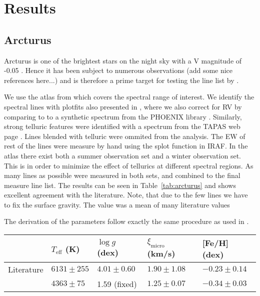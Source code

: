 \documentclass{aa}
\begin{document}
\section{Results}
\label{sec:results}



\subsection{Arcturus}
\label{sec:derived_parameters_of_the_sun}
Arcturus is one of the brightest stars on the night sky with a V magnitude of
-0.05 \citep{Ducati2002}. Hence it has been subject to numerous observations
(add some nice references here...) and is therefore a prime target for testing
the line list by \cite{Andreasen2016}.

We use the atlas from \cite{Hinkle2003} which covers the spectral range of
interest. We identify the spectral lines with plot\textunderscore{}fits also presented in
\cite{Andreasen2016}, where we also correct for RV by comparing to to a
synthetic spectrum from the PHOENIX library \citep{Husser2013}. Similarly,
strong telluric features were identified with a spectrum from the TAPAS
web page \citep{Bertaux2014}. Lines blended with telluric were ommited
from the analysis. The EW of rest of the lines were measure by hand using the
splot function in IRAF. In the atlas there exist both a summer observation
set and a winter observation set. This is in order to minimize the effect of
tellurics at different spectral regions. As many lines as possible were
measured in both sets, and combined to the final measure line list.
The results can be seen in Table~\ref{tab:arcturus} and shows excellent
agreement with the literature. Note, that due to the few  lines
we have to fix the surface gravity. The value was a mean of many literature
values

The derivation of the parameters follow exactly the same procedure as used
in \cite{Andreasen2016}.

\begin{table*}[htb!]
    \caption{The derived parameters for Arcturus with
    fixed surface gravity cut after 3$\sigma$ outlier removal. linelist: arcturus2Cut4ol.moog}
    \label{tab:arcturus}
    \centering
    \begin{tabular}{lllll}
      \hline\hline
                     & $T_\mathrm{eff}$ (K) &  $\log g$ (dex)  &   $\xi_\mathrm{micro}$ (km/s)   & [Fe/H] (dex)      \\
      \hline
        Literature   & $6131 \pm 255$       &  $4.01 \pm 0.60$ &    $1.90 \pm 1.08$              & $-0.23 \pm 0.14$ \\
      \hline
                     & $4363 \pm 75$        &   1.59 (fixed)   &    $1.25 \pm 0.07$              & $-0.34 \pm 0.03$ \\
      \hline
    \end{tabular}
\end{table*}
\end{document}
